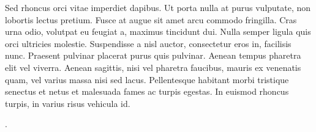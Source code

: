 Sed rhoncus orci vitae imperdiet dapibus. Ut porta nulla at purus vulputate, non lobortis lectus pretium. Fusce at augue sit amet arcu commodo fringilla. Cras urna odio, volutpat eu feugiat a, maximus tincidunt dui. Nulla semper ligula quis orci ultricies molestie. Suspendisse a nisl auctor, consectetur eros in, facilisis nunc. Praesent pulvinar placerat purus quis pulvinar. Aenean tempus pharetra elit vel viverra. Aenean sagittis, nisi vel pharetra faucibus, mauris ex venenatis quam, vel varius massa nisi sed lacus. Pellentesque habitant morbi tristique senectus et netus et malesuada fames ac turpis egestas. In euismod rhoncus turpis, in varius risus vehicula id.

.